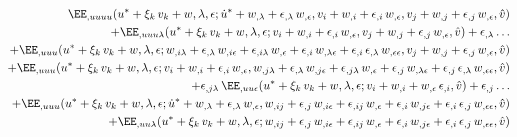 \begin{equation}
  \begin{aligned}[b]
    \EE_{,uuuu}(u^\ast + \xi_k \, v_k + w, \lambda, \epsilon; \dot{u}^\ast + w_{,\lambda} + \epsilon_{,\lambda} \, w_{,\epsilon}, v_i + w_{,i} + \epsilon_{,i} \,  w_{,\epsilon}, v_j + w_{,j} + \epsilon_{,j} \, w_{,\epsilon}, \hat{v}) &\\
    + \EE_{,uuu\lambda}(u^\ast + \xi_k \, v_k + w, \lambda, \epsilon; v_i + w_{,i} + \epsilon_{,i} \,  w_{,\epsilon}, v_j + w_{,j} + \epsilon_{,j} \, w_{,\epsilon}, \hat{v}) + \epsilon_{,\lambda} \ldots &\\
    + \EE_{,uuu}(u^\ast + \xi_k \, v_k + w, \lambda, \epsilon; w_{,i\lambda} + \epsilon_{,\lambda} \, w_{,i\epsilon} + \epsilon_{,i\lambda} \,  w_{,\epsilon}  + \epsilon_{,i} \,  w_{,\lambda\epsilon} + \epsilon_{,i} \, \epsilon_{,\lambda} \, w_{,\epsilon\epsilon}, v_j + w_{,j} + \epsilon_{,j} \, w_{,\epsilon}, \hat{v})\\
    + \EE_{,uuu}(u^\ast + \xi_k \, v_k + w, \lambda, \epsilon; v_i + w_{,i} + \epsilon_{,i} \, w_{,\epsilon}, w_{,j\lambda} + \epsilon_{,\lambda} \, w_{,j\epsilon} + \epsilon_{,j\lambda} \,  w_{,\epsilon}  + \epsilon_{,j} \,  w_{,\lambda\epsilon} + \epsilon_{,j} \, \epsilon_{,\lambda} \, w_{,\epsilon\epsilon}, \hat{v})\\
    + \epsilon_{,j\lambda} \, \EE_{,uu\epsilon}(u^\ast + \xi_k \, v_k + w, \lambda, \epsilon; v_i + w_{,i} + w_{,\epsilon} \, \epsilon_{,i}, \hat{v}) + \epsilon_{,j} \ldots &\\
    + \EE_{,uuu}(u^\ast + \xi_k \, v_k + w, \lambda, \epsilon; \dot{u}^\ast + w_{,\lambda} + \epsilon_{,\lambda} \, w_{,\epsilon}, w_{,ij} + \epsilon_{,j} \, w_{,i\epsilon} + \epsilon_{,ij} \, w_{,\epsilon} + \epsilon_{,i} \, w_{,j\epsilon} + \epsilon_{,i} \, \epsilon_{,j} \, w_{,\epsilon\epsilon} , \hat{v}) &\\
    + \EE_{,uu\lambda}(u^\ast + \xi_k \, v_k + w, \lambda, \epsilon; w_{,ij} + \epsilon_{,j} \, w_{,i\epsilon} + \epsilon_{,ij} \, w_{,\epsilon} + \epsilon_{,i} \, w_{,j\epsilon} + \epsilon_{,i} \, \epsilon_{,j} \, w_{,\epsilon\epsilon} , \hat{v}) &\\

\end{aligned}
\end{equation}
